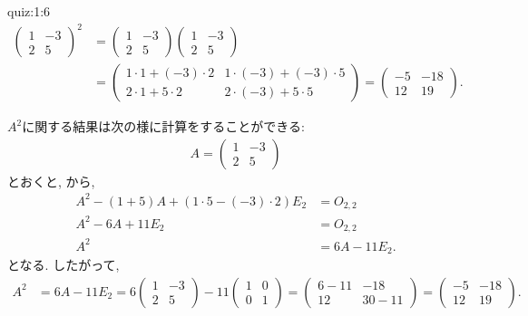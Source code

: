 \begin{answerof}{quiz:1:6}
  \begin{align*}
    \begin{pmatrix}
      1&-3\\2&5
    \end{pmatrix}^2
    &=
    \begin{pmatrix}
      1&-3\\2&5
    \end{pmatrix}
    \begin{pmatrix}
      1&-3\\2&5
    \end{pmatrix}\\
   & =
    \begin{pmatrix}
      1\cdot 1+(-3)\cdot 2&1\cdot(-3)+(-3)\cdot 5\\2\cdot1 +5\cdot2&2\cdot(-3) +5\cdot5
    \end{pmatrix}
    =
    \begin{pmatrix}
      -5&-18\\12&19
    \end{pmatrix}.
  \end{align*}

  $A^2$に関する結果は次の様に計算をすることができる:
    \begin{align*}
    A=
    \begin{pmatrix}
      1&-3\\2&5
    \end{pmatrix}
  \end{align*}
    とおくと,
  から,
  \begin{align*}
    A^2-(1+5)A+(1\cdot 5-(-3)\cdot2)E_2&=O_{2,2}\\
    A^2-6A+11E_2&=O_{2,2}\\
    A^2&=6A-11E_2.
  \end{align*}
  となる.
  したがって,
  \begin{align*}
    A^2&=6A-11E_2=
   6\begin{pmatrix}
      1&-3\\2&5
   \end{pmatrix}
   -11
  \begin{pmatrix}
      1&0\\0&1
  \end{pmatrix}
  =
  \begin{pmatrix}
      6-11&-18\\12&30-11
   \end{pmatrix}
  =
  \begin{pmatrix}
      -5&-18\\12&19
   \end{pmatrix}.
  \end{align*}
\end{answerof}

